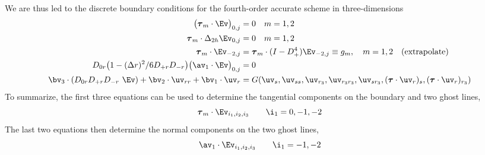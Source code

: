 We are thus led to the discrete boundary conditions for the fourth-order accurate scheme in three-dimensions
\begin{align}
    \big(\tauv_m\cdot\Ev\big)_{0,j}  &=0 \quad m=1,2 \\
 \tauv_m\cdot\Delta_{2h} \Ev_{0,j}  &=0 \quad m=1,2 \\
 \tauv_m\cdot\Ev_{-2,j} &= \tauv_m \cdot (I-D_+^4)\Ev_{-2,j} \equiv g_m , \quad m=1,2  \quad\mbox{(extrapolate)} \\
  D_{0r}\big(1- (\Delta r)^2/6 D_{+r}D_{-r}\big) \big(\av_1\cdot\Ev\big)_{0,j} &= 0 \\
  \bv_3\cdot(D_{0r}D_{+r}D_{-r}~\Ev) + \bv_2\cdot\uv_{rr} + \bv_1\cdot\uv_{r} 
                &= G(\uv_s,\uv_{ss},\uv_{\rc},\uv_{\rc\rc},\uv_{s\rc},(\tauv\cdot\uv_r)_s, (\tauv\cdot\uv_r)_\rc)
\end{align}
To summarize, the first three equations can be used to determine the tangential components
 on the boundary and two ghost lines,
\[
    \tauv_m\cdot\Ev_{i_1,i_2,i_3} \qquad \i_1=0,-1,-2
\]
The last two equations then determine the normal components on the two ghost lines,
\[
    \av_1\cdot\Ev_{i_1,i_2,i_3} \qquad \i_1=-1,-2
\]





